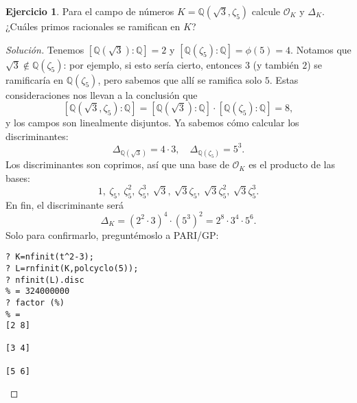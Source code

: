 \documentclass{article}
\newcounter{tarea}
\theoremstyle{definition}
\newtheorem{ejercicio}{Ejercicio}[tarea]
\newenvironment{solucion}{\begin{proof}[Solución]}{\end{proof}}
\newcommand{\QQ}{\mathbb{Q}}
\renewcommand{\O}{\mathcal{O}}
\begin{document}
\begin{ejercicio}
  Para el campo de números $K = \QQ (\sqrt{3},\zeta_5)$ calcule
  $\O_K$ y $\Delta_K$. ¿Cuáles primos racionales se ramifican en $K$?

  \ifdefined\solutions
  \begin{solucion}
    Tenemos $[\QQ (\sqrt{3}) : \QQ] = 2$ y
    $[\QQ (\zeta_5) : \QQ] = \phi (5) = 4$. Notamos que
    $\sqrt{3} \notin \QQ (\zeta_5)$: por ejemplo, si esto sería cierto,
    entonces $3$ (y también $2$) se ramificaría en $\QQ (\zeta_5)$, pero sabemos
    que allí se ramifica solo $5$. Estas consideraciones nos llevan a
    la conclusión que
    \[ [\QQ (\sqrt{3},\zeta_5) : \QQ] =
       [\QQ (\sqrt{3}) : \QQ]\cdot [\QQ (\zeta_5) : \QQ] = 8, \]
    y los campos son linealmente disjuntos. Ya sabemos cómo calcular los
    discriminantes:
    $$\Delta_{\QQ (\sqrt{3})} = 4\cdot 3, \quad \Delta_{\QQ (\zeta_5)} = 5^3.$$
    Los discriminantes son coprimos, así que una base de $\O_K$ es el
    producto de las bases:
    \[ 1, ~ \zeta_5, ~ \zeta_5^2, ~ \zeta_5^3, ~
       \sqrt{3}, ~ \sqrt{3}\zeta_5, ~ \sqrt{3}\zeta_5^2, ~ \sqrt{3}\zeta_5^3. \]
    En fin, el discriminante será
    $$\Delta_K = (2^2\cdot 3)^4\cdot (5^3)^2 = 2^8\cdot 3^4\cdot 5^6.$$
    Solo para confirmarlo, preguntémoslo a PARI/GP:
    \begin{framed}
\begin{verbatim}
? K=nfinit(t^2-3);
? L=rnfinit(K,polcyclo(5));
? nfinit(L).disc
% = 324000000
? factor (%)
% = 
[2 8]

[3 4]

[5 6]
\end{verbatim}
    \end{framed}
  \end{solucion}
  \fi
\end{ejercicio}
\end{document}
